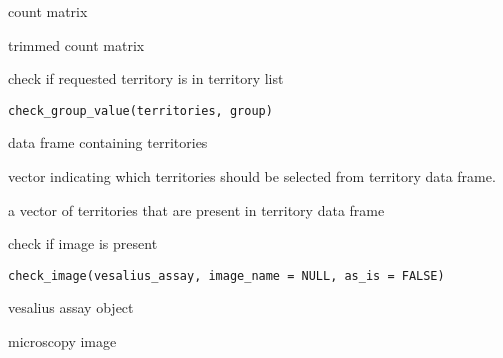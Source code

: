 \documentclass[a4paper]{book}
\begin{document}
%
\begin{Arguments}
\begin{ldescription}
\item[\code{counts}] count matrix
\end{ldescription}
\end{Arguments}
%
\begin{Value}
trimmed count matrix
\end{Value}
%
\begin{Description}
check if requested territory is in territory list
\end{Description}
%
\begin{Usage}
\begin{verbatim}
check_group_value(territories, group)
\end{verbatim}
\end{Usage}
%
\begin{Arguments}
\begin{ldescription}
\item[\code{territories}] data frame containing territories

\item[\code{group}] vector indicating which territories should be selected
from territory data frame.
\end{ldescription}
\end{Arguments}
%
\begin{Value}
a vector of territories that are present in territory data frame
\end{Value}
%
\begin{Description}
check if image is present
\end{Description}
%
\begin{Usage}
\begin{verbatim}
check_image(vesalius_assay, image_name = NULL, as_is = FALSE)
\end{verbatim}
\end{Usage}
%
\begin{Arguments}
\begin{ldescription}
\item[\code{vesalius\_assay}] vesalius assay object
\end{ldescription}
\end{Arguments}
%
\begin{Value}
microscopy image
\end{Value}
\end{document}
